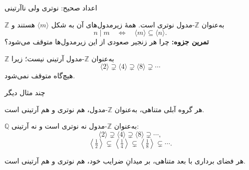 \begin{frame}[t]{اعداد صحیح: نوتری ولی ناآرتینی}
    \label{lec10:integers}
    \begin{example}
        $\mathbb Z$ به‌عنوان $\mathbb Z$-مدول نوتری است.
        همهٔ زیرمدول‌های آن به شکل $\langle m\rangle$ هستند و
        \[
            n\mid m
            \quad\Longleftrightarrow\quad
            \langle m\rangle\subseteq\langle n\rangle.
        \]
        \textbf{تمرین جزوه:} چرا هر زنجیر صعودی از این زیرمدول‌ها
        متوقف می‌شود؟
    \end{example}
    \begin{example}
        $\mathbb Z$ به‌عنوان $\mathbb Z$-مدول آرتینی نیست؛ زیرا
        \[
            \langle2\rangle\supsetneq\langle4\rangle
            \supsetneq\langle8\rangle\supsetneq\cdots
        \]
        هیچ‌گاه متوقف نمی‌شود.
    \end{example}
\end{frame}

\begin{frame}[t]{چند مثال دیگر}
    \label{lec10:chain-examples}
    \begin{example}
        هر گروه آبلی متناهی، به‌عنوان $\mathbb Z$-مدول،
        هم نوتری و هم آرتینی است.
    \end{example}
    \begin{example}
        $\mathbb Q$ به‌عنوان $\mathbb Z$-مدول نه نوتری است و نه آرتینی:
        \[
            \langle2\rangle\supsetneq\langle4\rangle
            \supsetneq\langle8\rangle\supsetneq\cdots,
        \]
        \[
            \left\langle\tfrac12\right\rangle
            \subsetneq\left\langle\tfrac14\right\rangle
            \subsetneq\left\langle\tfrac18\right\rangle
            \subsetneq\cdots.
        \]
    \end{example}
    \begin{example}
        هر فضای برداری با بعد متناهی، بر میدانِ ضرایب خود،
        هم نوتری و هم آرتینی است.
    \end{example}
\end{frame}

